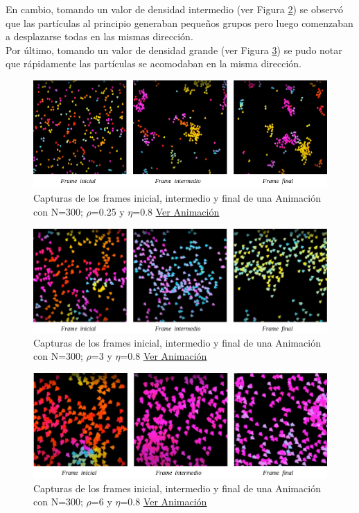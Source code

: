 \documentclass[12pt, a4paper]{report}
\begin{document}
En cambio, tomando un valor de densidad intermedio (ver Figura \ref{fig:density_N300_n08_d3}) se observó que las partículas al principio generaban pequeños grupos pero luego comenzaban a desplazarse todas en las mismas dirección.\\

Por último, tomando un valor de densidad grande (ver Figura \ref{fig:density_N300_n08_d6}) se pudo notar que rápidamente las partículas se acomodaban en la misma dirección. 

\begin{figure}[h]
\includegraphics[scale=0.54]{density_N300_n08_d025.png}
\centering 
\caption{Capturas de los frames inicial, intermedio y final de una Animación con N=300; $\rho$=0.25 y $\eta$=0.8 \href{https://www.youtube.com/watch?v=j0crtCYmx9E}{\underline{Ver Animación}}}
\label{fig:density_N300_n08_d025}
\end{figure}

\begin{figure}[h]
\includegraphics[scale=0.4]{density_N300_n08_d3.png}
\centering 
\caption{Capturas de los frames inicial, intermedio y final de una Animación con N=300; $\rho$=3 y $\eta$=0.8 \href{https://www.youtube.com/watch?v=Ez3LWEwRvmk}{\underline{Ver Animación}}}
\label{fig:density_N300_n08_d3}
\end{figure}

\pagebreak
\begin{figure}[h]
\includegraphics[scale=0.4]{density_N300_n08_d6.png}
\centering 
\caption{Capturas de los frames inicial, intermedio y final de una Animación con N=300; $\rho$=6 y $\eta$=0.8 \href{https://youtu.be/yM9k2Y_oSKs}{\underline{Ver Animación}}} 
\label{fig:density_N300_n08_d6}
\end{figure}
\end{document}

